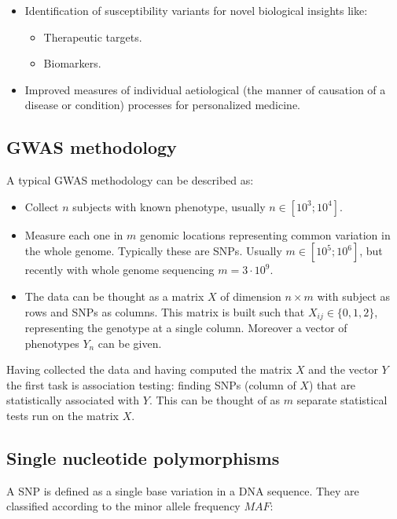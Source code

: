 	\begin{multicols}{2}
		\begin{itemize}
			\item Identification of susceptibility variants for novel biological insights like:

				\begin{itemize}
					\item Therapeutic targets.
					\item Biomarkers.
				\end{itemize}

			\item Improved measures of individual aetiological (the manner of causation of a disease or condition) processes for personalized medicine.
		\end{itemize}
	\end{multicols}

	\subsection{GWAS methodology}
	A typical GWAS methodology can be described as:

	\begin{multicols}{2}
		\begin{itemize}
			\item Collect $n$ subjects with known phenotype, usually $n\in [10^3;10^4]$.
			\item Measure each one in $m$ genomic locations representing common variation in the whole genome.
				Typically these are SNPs.
				Usually $m\in [10^5;10^6]$, but recently with whole genome sequencing $m = 3\cdot 10^9$.
			\item The data can be thought as a matrix $X$ of dimension $n\times m$ with subject as rows and SNPs as columns.
				This matrix is built such that $X_{ij} \in \{0,1,2\}$, representing the genotype at a single column.
				Moreover a vector of phenotypes $Y_n$ can be given.
		\end{itemize}
	\end{multicols}

	Having collected the data and having computed the matrix $X$ and the vector $Y$ the first task is association testing: finding SNPs (column of $X$) that are statistically associated with $Y$.
	This can be thought of as $m$ separate statistical tests run on the matrix $X$.

	\subsection{Single nucleotide polymorphisms}
	A SNP is defined as a single base variation in a DNA sequence.
	They are classified according to the minor allele frequency $MAF$:

